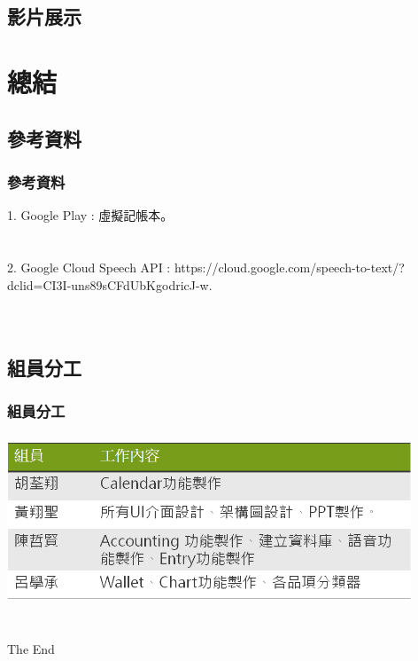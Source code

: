 \documentclass{beamer}
\begin{document}


\subsection{影片展示} %

\section{總結}


\subsection{參考資料} %

\begin{frame}
\frametitle{參考資料}
1. Google Play : 虛擬記帳本。\\~\\~\\

2. Google Cloud Speech API : 
https://cloud.google.com/speech-to-text/?dclid=CI3I-uns89sCFdUbKgodricJ-w.\\~\\~\\


\end{frame}

\subsection{組員分工} %

\begin{frame}
\frametitle{組員分工}
\includegraphics[width=4.75in,height=2in]{3.png}\\~\\
\end{frame}




\begin{frame}
\Huge{\centerline{The End}}
\end{frame}

\end{document}

